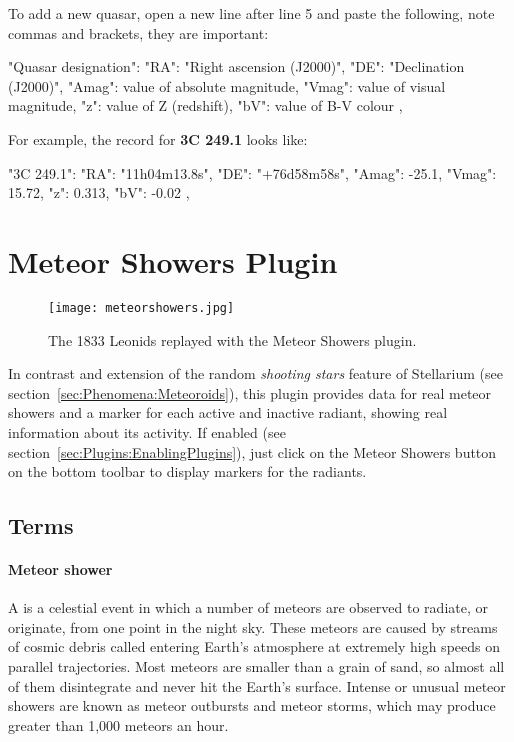 To add a new quasar, open a new line after line 5 and paste the following, note commas and brackets, they are important:

\begin{configfile}
"Quasar designation":
{
    "RA": "Right ascension (J2000)",
    "DE": "Declination (J2000)",
    "Amag": value of absolute magnitude,
    "Vmag": value of visual magnitude,
    "z": value of Z (redshift),
    "bV": value of B-V colour
},
\end{configfile}

\noindent For example, the record for \textbf{3C 249.1} looks like:
\begin{configfile}
"3C 249.1":
{
    "RA": "11h04m13.8s",
    "DE": "+76d58m58s",
    "Amag": -25.1,
    "Vmag": 15.72,
    "z": 0.313,
    "bV": -0.02
},
\end{configfile}


\newpage


\section{Meteor Showers Plugin}
\label{sec:plugins:MeteorShowers}

\begin{figure}[ht]
\texttt{[image: meteorshowers.jpg]}
\caption{The 1833 Leonids replayed with the Meteor Showers plugin.}
\label{fig:plugins:MeteorShowers}
\end{figure}

\noindent In contrast and extension of the random \emph{shooting stars}
feature of Stellarium (see section~\ref{sec:Phenomena:Meteoroids}), this 
plugin provides data for real meteor showers and a marker for each 
active and inactive radiant, showing real information about its activity. 
If enabled (see section~\ref{sec:Plugins:EnablingPlugins}), just click 
on the Meteor Showers button   on the bottom
toolbar to display markers for the radiants.


\subsection{Terms}
\label{sec:plugins:MeteorShowers:terms}

\paragraph{Meteor shower}
A  is a celestial event in which a number of
meteors are observed to radiate, or originate, from one point in the
night sky. These meteors are caused by streams of cosmic debris called
 entering Earth's atmosphere at extremely high speeds on
parallel trajectories. Most meteors are smaller than a grain of sand,
so almost all of them disintegrate and never hit the Earth's
surface. Intense or unusual meteor showers are known as meteor
outbursts and meteor storms, which may produce greater than 1,000
meteors an hour.

